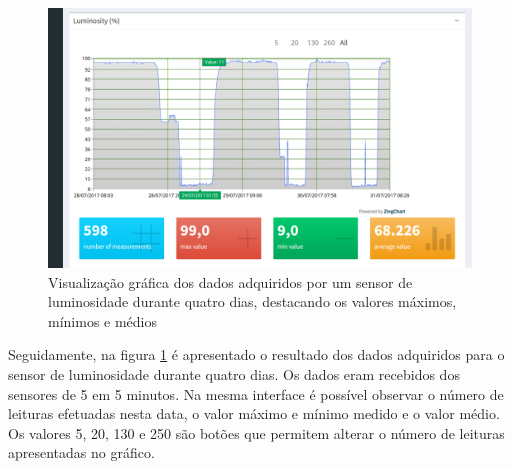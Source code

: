 \newpage

\begin{figure}[h]
	\centering
	\includegraphics[width=0.8\linewidth]{prints-web/humidity.png}
	\caption{Visualização gráfica dos dados adquiridos por um sensor de luminosidade durante quatro dias, destacando os valores máximos, mínimos e médios}
	\label{grafico_humidade}
\end{figure}





Seguidamente, na figura \ref{grafico_humidade} é apresentado o resultado dos dados adquiridos para o sensor de luminosidade durante quatro dias. Os dados eram recebidos dos sensores de 5 em 5 minutos. Na mesma interface é possível observar o número de leituras efetuadas nesta data, o valor máximo e mínimo medido e o valor médio. Os valores 5, 20, 130 e 250 são botões que permitem alterar o número de leituras apresentadas no gráfico. 
 

